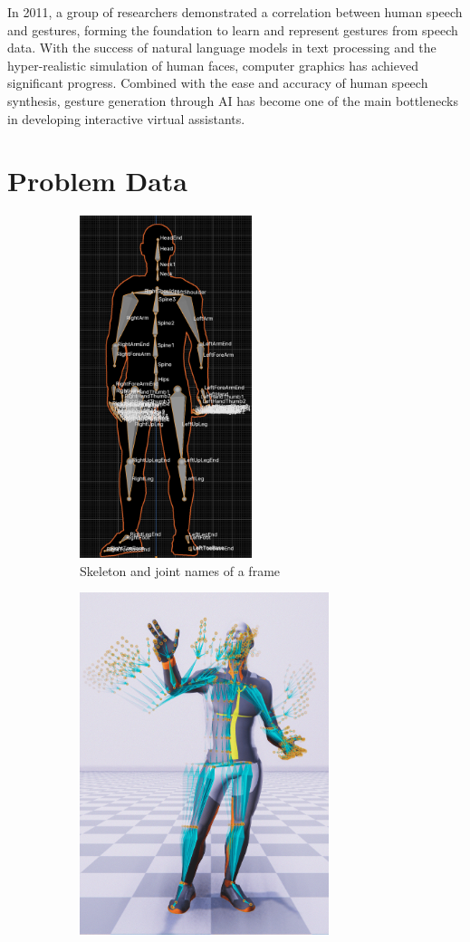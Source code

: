 In 2011, a group of researchers \cite{bergmann2011relation} demonstrated a correlation between human speech and gestures, forming the foundation to learn and represent gestures from speech data. With the success of natural language models in text processing and the hyper-realistic simulation of human faces, computer graphics has achieved significant progress. Combined with the ease and accuracy of human speech synthesis, gesture generation through AI has become one of the main bottlenecks in developing interactive virtual assistants.

\section{Problem Data}
\label{sec:Data}

\begin{figure}[h]
	\centering
	\begin{subfigure}{0.49\textwidth}
		\centering
		\includegraphics[height=10cm]{images/Skeleton.png}
		\caption{\small Skeleton and joint names of a frame}
		\label{fig:Skeleton}
	\end{subfigure}
	\hfill
	\begin{subfigure}{0.49\textwidth}
		\centering
		\includegraphics[height=10cm]{images/MotionPastAndFuture.png}

\end{subfigure}
\end{figure}
